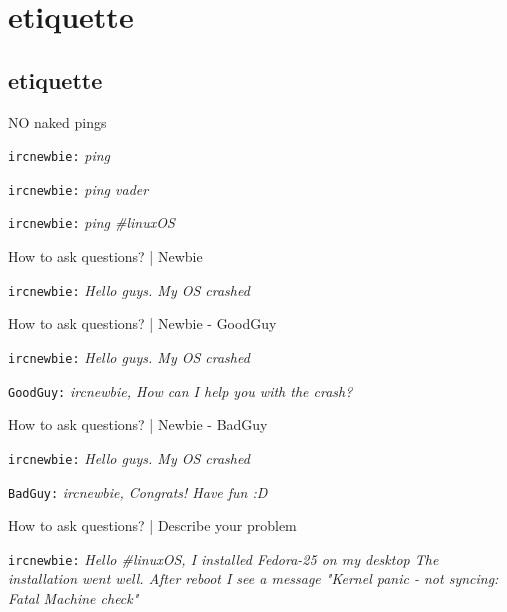 \documentclass[10pt]{beamer}
\begin{document}
\section{etiquette}
\label{sec:orgf134d2e}
\subsection{etiquette}
\label{sec:org6a9e99d}
\begin{frame}[fragile,label={sec:org581a661}]{NO naked pings}
 \begin{block}{}
\texttt{ircnewbie:} \emph{ping}

\texttt{ircnewbie:} \emph{ping vader}

\texttt{ircnewbie:} \emph{ping \#linuxOS}
\end{block}
\end{frame}

\begin{frame}[fragile,label={sec:orgfecdcf4}]{How to ask questions? | Newbie}
 \begin{block}{}
\texttt{ircnewbie:} \emph{Hello guys. My OS crashed}
\end{block}
\end{frame}


\begin{frame}[fragile,label={sec:org6cb209e}]{How to ask questions? | Newbie - GoodGuy}
 \begin{block}{}
\texttt{ircnewbie:} \emph{Hello guys. My OS crashed}

\texttt{GoodGuy:} \emph{ircnewbie, How can I help you with the crash?}
\end{block}
\end{frame}


\begin{frame}[fragile,label={sec:org18f939a}]{How to ask questions? | Newbie - BadGuy}
 \begin{block}{}
\texttt{ircnewbie:} \emph{Hello guys. My OS crashed}

\texttt{BadGuy:} \emph{ircnewbie, Congrats! Have fun :D}
\end{block}
\end{frame}

\begin{frame}[fragile,label={sec:org5afdde5}]{How to ask questions? | Describe your problem}
 \begin{block}{}
\texttt{ircnewbie:} \emph{Hello \#linuxOS, I installed Fedora-25 on my desktop The installation went well. After reboot I see a message "Kernel
panic - not syncing: Fatal Machine check"}
\end{block}
\end{frame}
\end{document}
